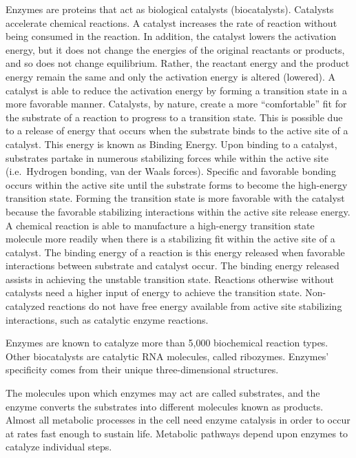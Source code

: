 Enzymes are proteins that act as biological catalysts (biocatalysts). Catalysts accelerate chemical reactions. A catalyst increases the rate of reaction without being consumed in the reaction. In addition, the catalyst lowers the activation energy, but it does not change the energies of the original reactants or products, and so does not change equilibrium. Rather, the reactant energy and the product energy remain the same and only the activation energy is altered (lowered). A catalyst is able to reduce the activation energy by forming a transition state in a more favorable manner. Catalysts, by nature, create a more ``comfortable'' fit for the substrate of a reaction to progress to a transition state. This is possible due to a release of energy that occurs when the substrate binds to the active site of a catalyst. This energy is known as Binding Energy. Upon binding to a catalyst, substrates partake in numerous stabilizing forces while within the active site (i.e.~Hydrogen bonding, van der Waals forces). Specific and favorable bonding occurs within the active site until the substrate forms to become the high-energy transition state. Forming the transition state is more favorable with the catalyst because the favorable stabilizing interactions within the active site release energy. A chemical reaction is able to manufacture a high-energy transition state molecule more readily when there is a stabilizing fit within the active site of a catalyst. The binding energy of a reaction is this energy released when favorable interactions between substrate and catalyst occur. The binding energy released assists in achieving the unstable transition state. Reactions otherwise without catalysts need a higher input of energy to achieve the transition state. Non-catalyzed reactions do not have free energy available from active site stabilizing interactions, such as catalytic enzyme reactions.

Enzymes are known to catalyze more than 5,000 biochemical reaction types. Other biocatalysts are catalytic RNA molecules, called ribozymes. Enzymes' specificity comes from their unique three-dimensional structures.

The molecules upon which enzymes may act are called substrates, and the enzyme converts the substrates into different molecules known as products. Almost all metabolic processes in the cell need enzyme catalysis in order to occur at rates fast enough to sustain life. Metabolic pathways depend upon enzymes to catalyze individual steps.

